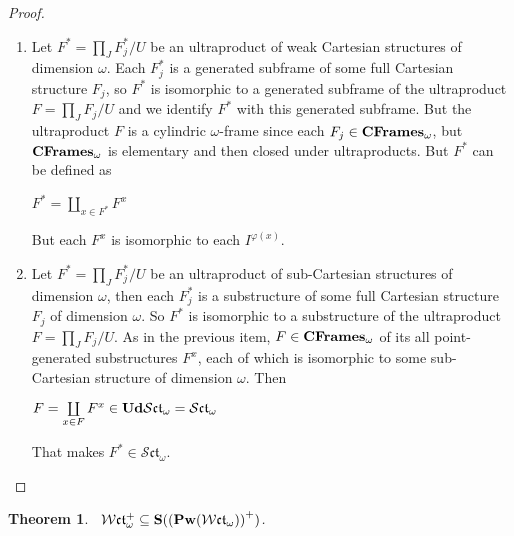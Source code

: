 \documentclass{article}
\theoremstyle{defin}
\theoremstyle{theorem}
\newtheorem{theorem}{Theorem}
\theoremstyle{claim}
\theoremstyle{prop}
\theoremstyle{lemma}
\theoremstyle{fact}
\theoremstyle{remark}
\theoremstyle{ex}
\theoremstyle{col}
\theoremstyle{question}
\begin{document}
\begin{proof}
$ $
\begin{enumerate}
\item Let $F^* = \prod \limits_{J} F^*_j / U$ be an ultraproduct of weak Cartesian structures of dimension $\omega$. 
Each $F^*_j$ is a generated subframe of some full Cartesian structure $F_j$, 
so $F^*$ is isomorphic to a generated subframe of the ultraproduct 
$F = \prod \limits_{J} F_j / U$ and we identify $F^*$ with this generated subframe.
But the ultraproduct $F$ is a cylindric $\omega$-frame since each $F_j \in {\bf CFrames}_{\omega}$,
but ${\bf CFrames}_{\omega}$ is elementary and then closed under ultraproducts. 
But $F^*$ can be defined as
\begin{center}
$F^* = \coprod \limits_{x \in F^*} F^x$
\end{center}
But each $F^x$ is isomorphic to each $I^{\varphi(x)}$.
\item Let $F^* = \prod \limits_{J} F^*_j / U$ be an ultraproduct of sub-Cartesian structures of dimension 
$\omega$, then each $F^*_j$ is a substructure of some full Cartesian structure $F_j$ of dimension $\omega$.
So $F^*$ is isomorphic to a substructure of the ultraproduct $F = \prod \limits_{J} F_j / U$. 
As in the previous item, $F \in {\bf CFrames}_{\omega}$ of its all point-generated substructures $F^x$,
each of which is isomorphic to some sub-Cartesian structure of dimension $\omega$. Then
\begin{center}
$F = \coprod \limits_{x \in F} F^{x} \in {\bf Ud}\mathcal{S}\mathfrak{ct}_{\omega} = \mathcal{S}\mathfrak{ct}_{\omega}$
\end{center}
That makes $F^* \in \mathcal{S}\mathfrak{ct}_{\omega}$.
\end{enumerate}
\end{proof}

\begin{theorem}~\label{cmfact}
$\mathcal{W}\mathfrak{ct}_{\omega}^{+} \subseteq {\bf S} ({({\bf Pw}(\mathcal{W}\mathfrak{ct}_{\omega}))}^{+})$.
\end{theorem}
\end{document}
